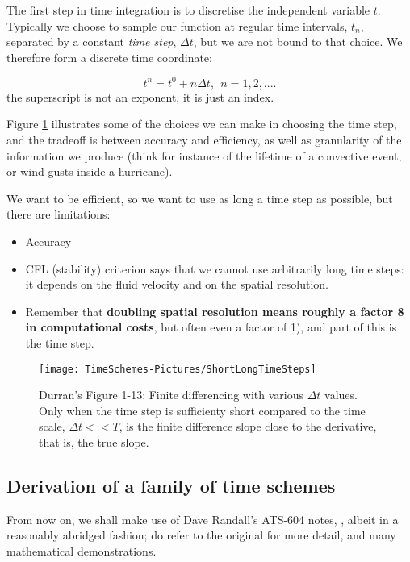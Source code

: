 The first step in time integration is to discretise the independent variable $t$. Typically we choose to sample our function at regular time intervals, $t_n$, separated by a constant \emph{time step}, $\Delta t$, but we are not bound to that choice. We therefore form a discrete time coordinate:

\begin{equation}
	t^n = t^0 + n \Delta t, ~~ n=1,2, ....
\end{equation}
the superscript is not an exponent, it is just an index.

Figure \ref{ShortLongTimeSteps} illustrates some of the choices we can make in choosing the time step, and the tradeoff is between accuracy and efficiency, as well as granularity of the information we produce (think for instance of the lifetime of a convective event, or wind gusts inside a hurricane).

We want to be efficient, so we want to use as long a time step as possible, but there are limitations:
\begin{itemize}
	\item Accuracy
	\item CFL (stability) criterion says that we cannot use arbitrarily long time steps: it depends on the fluid velocity and on the spatial resolution. 
	\item Remember that {\bf doubling spatial resolution means roughly a factor 8 in computational costs}, but often even a factor of 1), and part of this is the time step.
\end{itemize}

\begin{figure}[h!]
	\texttt{[image: TimeSchemes-Pictures/ShortLongTimeSteps]}
	\caption{Durran's Figure 1-13: Finite differencing with various $\Delta t$ values. Only when the time step is sufficienty short compared to the time scale, $\Delta t << T$, is the finite difference slope close to the derivative, that is, the true slope.}
	\label{ShortLongTimeSteps}
\end{figure}

\subsection{Derivation of a family of time schemes}
From now on, we shall make use of Dave Randall's ATS-604 notes, \cite{Randall-notes}, albeit in a reasonably abridged fashion; do refer to the original for more detail, and many mathematical demonstrations.

